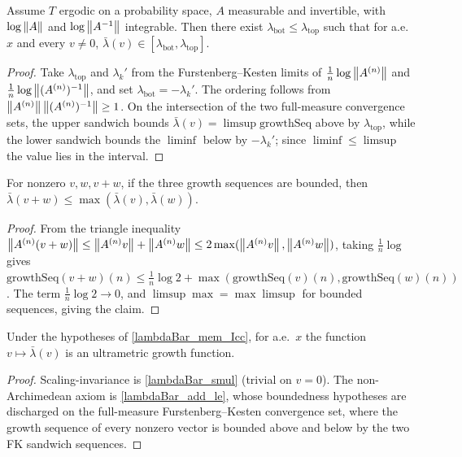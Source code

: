 \begin{lemma}\label{lambdaBar_mem_Icc}
  \leanok
  Assume $T$ ergodic on a probability space, $A$ measurable and invertible, with
  $\log\left\lVert A \right\rVert$ and $\log\left\lVert A^{-1} \right\rVert$ integrable. Then there exist
  $\lambda_{\mathrm{bot}}\le\lambda_{\mathrm{top}}$ such that for a.e.\ $x$ and
  every $v\neq 0$, $\bar\lambda(v)\in[\lambda_{\mathrm{bot}},\lambda_{\mathrm{top}}]$.
  \begin{proof}\leanok
  Take $\lambda_{\mathrm{top}}$ and $\lambda_k'$ from the Furstenberg--Kesten
  limits of $\tfrac1n\log\left\lVert A^{(n)} \right\rVert$ and $\tfrac1n\log\left\lVert (A^{(n)})^{-1} \right\rVert$,
  and set $\lambda_{\mathrm{bot}}=-\lambda_k'$. The ordering follows from
  $\left\lVert A^{(n)} \right\rVert\left\lVert (A^{(n)})^{-1} \right\rVert\ge 1$. On the intersection of the two
  full-measure convergence sets, the upper sandwich bounds
  $\bar\lambda(v)=\limsup\mathrm{growthSeq}$ above by $\lambda_{\mathrm{top}}$,
  while the lower sandwich bounds the $\liminf$ below by $-\lambda_k'$; since
  $\liminf\le\limsup$ the value lies in the interval.
  \end{proof}
\end{lemma}

\begin{lemma}\label{lambdaBar_add_le}
  \leanok
  For nonzero $v,w,v+w$, if the three growth sequences are bounded, then
  $\bar\lambda(v+w)\le\max(\bar\lambda(v),\bar\lambda(w))$.
  \begin{proof}\leanok
  From the triangle inequality $\left\lVert A^{(n)}(v+w) \right\rVert\le\left\lVert A^{(n)}v \right\rVert+\left\lVert A^{(n)}w \right\rVert
  \le 2\max(\left\lVert A^{(n)}v \right\rVert,\left\lVert A^{(n)}w \right\rVert)$, taking $\tfrac1n\log$ gives
  $\mathrm{growthSeq}(v+w)(n)\le\tfrac1n\log 2 +
  \max(\mathrm{growthSeq}(v)(n),\mathrm{growthSeq}(w)(n))$. The term
  $\tfrac1n\log 2\to 0$, and $\limsup\max=\max\limsup$ for bounded sequences,
  giving the claim.
  \end{proof}
\end{lemma}

\begin{theorem}\label{isUltrametricGrowth_lambdaBar}
  \leanok
  Under the hypotheses of \ref{lambdaBar_mem_Icc}, for a.e.\ $x$ the function
  $v\mapsto\bar\lambda(v)$ is an ultrametric growth function.
  \begin{proof}\leanok
  Scaling-invariance is \ref{lambdaBar_smul} (trivial on $v=0$). The
  non-Archimedean axiom is \ref{lambdaBar_add_le}, whose boundedness hypotheses
  are discharged on the full-measure Furstenberg--Kesten convergence set, where
  the growth sequence of every nonzero vector is bounded above and below by the
  two FK sandwich sequences.
  \end{proof}
\end{theorem}


